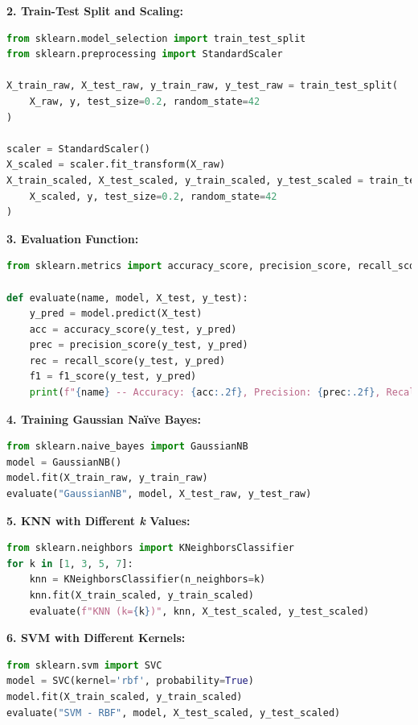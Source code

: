 \documentclass[12pt]{article}
\begin{document}
\textbf{2. Train-Test Split and Scaling:}
\begin{lstlisting}[language=Python]
from sklearn.model_selection import train_test_split
from sklearn.preprocessing import StandardScaler

X_train_raw, X_test_raw, y_train_raw, y_test_raw = train_test_split(
    X_raw, y, test_size=0.2, random_state=42
)

scaler = StandardScaler()
X_scaled = scaler.fit_transform(X_raw)
X_train_scaled, X_test_scaled, y_train_scaled, y_test_scaled = train_test_split(
    X_scaled, y, test_size=0.2, random_state=42
)
\end{lstlisting}

\textbf{3. Evaluation Function:}
\begin{lstlisting}[language=Python]
from sklearn.metrics import accuracy_score, precision_score, recall_score, f1_score, confusion_matrix, roc_curve, auc

def evaluate(name, model, X_test, y_test):
    y_pred = model.predict(X_test)
    acc = accuracy_score(y_test, y_pred)
    prec = precision_score(y_test, y_pred)
    rec = recall_score(y_test, y_pred)
    f1 = f1_score(y_test, y_pred)
    print(f"{name} -- Accuracy: {acc:.2f}, Precision: {prec:.2f}, Recall: {rec:.2f}, F1 Score: {f1:.2f}")
\end{lstlisting}

\textbf{4. Training Gaussian Na\"ive Bayes:}
\begin{lstlisting}[language=Python]
from sklearn.naive_bayes import GaussianNB
model = GaussianNB()
model.fit(X_train_raw, y_train_raw)
evaluate("GaussianNB", model, X_test_raw, y_test_raw)
\end{lstlisting}

\textbf{5. KNN with Different \textit{k} Values:}
\begin{lstlisting}[language=Python]
from sklearn.neighbors import KNeighborsClassifier
for k in [1, 3, 5, 7]:
    knn = KNeighborsClassifier(n_neighbors=k)
    knn.fit(X_train_scaled, y_train_scaled)
    evaluate(f"KNN (k={k})", knn, X_test_scaled, y_test_scaled)
\end{lstlisting}

\textbf{6. SVM with Different Kernels:}
\begin{lstlisting}[language=Python]
from sklearn.svm import SVC
model = SVC(kernel='rbf', probability=True)
model.fit(X_train_scaled, y_train_scaled)
evaluate("SVM - RBF", model, X_test_scaled, y_test_scaled)
\end{lstlisting}
\end{document}
